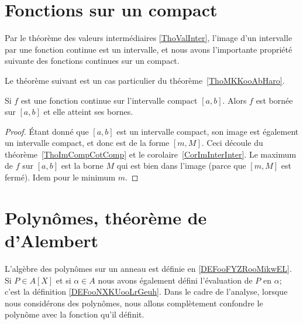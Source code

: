 \section{Fonctions sur un compact}

Par le théorème des valeurs intermédiaires \ref{ThoValInter}, l'image d'un intervalle par une fonction continue est un intervalle, et nous avons l'importante propriété suivante des fonctions continues sur un compact.

Le théorème suivant est un cas particulier du théorème~\ref{ThoMKKooAbHaro}.
\begin{theorem}
	Si \( f\) est une fonction continue sur l'intervalle compact \( [a,b]\). Alors \( f\) est bornée sur \( [a,b]\) et elle atteint ses bornes.
\end{theorem}

\begin{proof}
	Étant donné que \( [a,b]\) est un intervalle compact, son image est également un intervalle compact, et donc est de la forme \( [m,M]\). Ceci découle du théorème~\ref{ThoImCompCotComp} et le corolaire~\ref{CorImInterInter}. Le maximum de \( f\) sur \( [a,b]\) est la borne \( M\) qui est bien dans l'image (parce que \( [m,M]\) est fermé). Idem pour le minimum \( m\).
\end{proof}

\section{Polynômes, théorème de d'Alembert}

L'algèbre des polynômes sur un anneau est définie en \ref{DEFooFYZRooMikwEL}. Si \( P\in A[X]\) et si \( \alpha\in A\) nous avons également défini l'évaluation de \( P\) en \( \alpha\); c'est la définition \ref{DEFooNXKUooLrGeuh}. Dans le cadre de l'analyse, lorsque nous considérons des polynômes, nous allons complètement confondre le polynôme avec la fonction qu'il définit.


